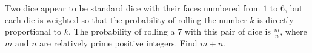 Two dice appear to be standard dice with their faces numbered from $1$ to $6$,  but each die is weighted so that the probability of rolling the number $k$ is directly proportional to $k$. The probability of rolling a $7$ with this pair of dice is $\tfrac{m}{n}$,  where $m$ and $n$ are relatively prime positive integers. Find $m + n$.